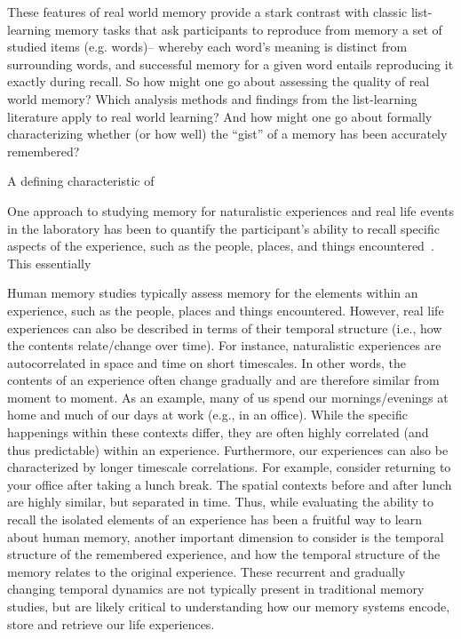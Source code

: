 
These features of real world memory provide a stark contrast with classic list-learning memory tasks that ask participants to reproduce from memory a set of studied items (e.g. words)-- whereby each word's meaning is distinct from surrounding words, and successful memory for a given word entails reproducing it exactly during recall.  So how might one go about assessing the quality of real world memory?  Which analysis methods and findings from the list-learning literature apply to real world learning?  And how might one go about formally characterizing whether (or how well) the ``gist'' of a memory has been accurately remembered?




A defining characteristic of 

One approach to studying memory for naturalistic experiences and real life events in the laboratory has been to quantify the participant's ability to recall specific aspects of the experience, such as the people, places, and things encountered~\citep[e.g.\ for review see][]{KoriGold94}.  This essentially 

Human memory studies typically assess memory for the elements within an experience, such as the people, places and things encountered. However, real life experiences can also be described in terms of their temporal structure (i.e., how the contents relate/change over time).  For instance, naturalistic experiences are autocorrelated in space and time on short timescales. In other words, the contents of an experience often change gradually and are therefore similar from moment to moment. As an example, many of us spend our mornings/evenings at home and much of our days at work (e.g., in an office). While the specific happenings within these contexts differ, they are often highly correlated (and thus predictable) within an experience. Furthermore, our experiences can also be characterized by longer timescale correlations. For example, consider returning to your office after taking a lunch break. The spatial contexts before and after lunch are highly similar, but separated in time. Thus, while evaluating the ability to recall the isolated elements of an experience has been a fruitful way to learn about human memory, another important dimension to consider is the temporal structure of the remembered experience, and how the temporal structure of the memory relates to the original experience. These recurrent and gradually changing temporal dynamics are not typically present in traditional memory studies, but are likely critical to understanding how our memory systems encode, store and retrieve our life experiences.



